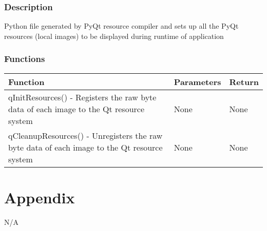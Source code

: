 \documentclass[12pt, titlepage]{article}
\begin{document}
  \subsubsection{Description}
  Python file generated by PyQt resource compiler and sets up all the PyQt resources (local images) to be displayed during runtime of application
  

  \subsubsection{Functions}
  
    \noindent \begin{tabular}{| p{} | p{}| p{}|}
      \hline
      \rowcolor[gray]{0.9}
      Function & Parameters & Return\\
      \hline
      qInitResources() - Registers the raw byte data of each image to the Qt resource system &  None & None \\
      \hline
      qCleanupResources() - Unregisters the raw byte data of each image to the Qt resource system & None & None \\
      \hline
    \end{tabular}


\newpage



\newpage

\section{Appendix} \label{Appendix}
N/A \\
\end{document}
